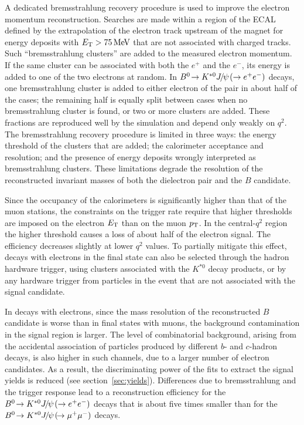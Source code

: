 \documentclass[12pt,a4paper]{article}
\def\Ppsi        {\ensuremath{\uppsi}\xspace}
\def\PB      {\ensuremath{\mathrm{B}}\xspace}
\def\PJ      {\ensuremath{\mathrm{J}}\xspace}
\def\PK      {\ensuremath{\mathrm{K}}\xspace}
\def\Pb      {\ensuremath{\mathrm{b}}\xspace}
\def\Pc      {\ensuremath{\mathrm{c}}\xspace}
\def\Pe      {\ensuremath{\mathrm{e}}\xspace}
\def\Ppsi        {\ensuremath{\psi}\xspace}
\def\PB      {\ensuremath{B}\xspace}
\def\PJ      {\ensuremath{J}\xspace}
\def\PK      {\ensuremath{K}\xspace}
\def\Pb      {\ensuremath{b}\xspace}
\def\Pc      {\ensuremath{c}\xspace}
\def\Pe      {\ensuremath{e}\xspace}
\def\en         {\ensuremath{\Pe^-}\xspace}   \def\ep         {\ensuremath{\Pe^+}\xspace}
\def\epem       {\ensuremath{\Pe^+\Pe^-}\xspace}
\def\cquark    {\ensuremath{\Pc}\xspace}
\def\bquark    {\ensuremath{\Pb}\xspace}
\def\kaon  {\ensuremath{\PK}\xspace}
\def\Kstarz  {\ensuremath{\kaon^{*0}}\xspace}
\def\B       {\ensuremath{\PB}\xspace}
\def\Bd      {\ensuremath{\B^0}\xspace}
\def\jpsi     {\ensuremath{{\PJ\mskip -3mu/\mskip -2mu\Ppsi\mskip 2mu}}\xspace}
\newcommand{\decay}[2]{\ensuremath{#1\!\to #2}\xspace}         \def\ra                 {\ensuremath{\rightarrow}\xspace}
\def\to                 {\ensuremath{\rightarrow}\xspace}
\def\qsq       {\ensuremath{q^2}\xspace}
\newcommand{\mev}{\ensuremath{\mathrm{\,Me\kern -0.1em V}}\xspace}
\def\pt         {\mbox{$p_{\rm T}$}\xspace}
\def\et         {\mbox{$E_{\rm T}$}\xspace}
\def\cqsq{central-\qsq}
\def\BdToKstJPsmm{\mbox{\decay{\Bd}{\Kstarz \jpsi(\decay{}{\mumu})}}\xspace}
\def\BdToKstJPsee{\mbox{\decay{\Bd}{\Kstarz \jpsi(\to\epem)}}\xspace}
\begin{document}
A dedicated bremsstrahlung recovery procedure is used to improve the electron momentum reconstruction.
Searches are made within a region of the ECAL defined by the extrapolation of the electron track upstream of the magnet for energy deposits with $\et > 75\mev$ that are not associated with charged tracks.
Such ``bremsstrahlung clusters'' are added to the measured electron momentum.
If the same cluster can be associated with both the \ep and the \en, its energy is added to one of the two electrons at random.
In \BdToKstJPsee decays, one bremsstrahlung cluster is added to either electron of the pair in about half of the cases; the remaining half is equally split between cases when no bremsstrahlung cluster is found, or two or more clusters are added.
These fractions are reproduced well by the simulation and depend only weakly on \qsq. 
The bremsstrahlung recovery procedure is limited in three ways: the energy threshold of the clusters that are added; the calorimeter acceptance and resolution; and the presence of energy deposits wrongly interpreted as bremsstrahlung clusters.
These limitations degrade the resolution of the reconstructed invariant masses of both the dielectron pair and the \B candidate. 

Since the occupancy of the calorimeters is significantly higher than that of the muon stations, the constraints on the trigger rate require that higher thresholds are imposed on the electron \et than on the muon \pt.
In the \cqsq region the higher threshold causes a loss of about half of the electron signal.
The efficiency decreases slightly at lower \qsq values.
To partially mitigate this effect, decays with electrons in the final state can also be selected through the hadron hardware trigger, using clusters associated with the \Kstarz decay products, or by any hardware trigger from particles in the event that are not associated with the signal candidate.

In decays with electrons, since the mass resolution of the reconstructed \B candidate is worse than in final states with muons, the background contamination in the signal region is larger.
The level of combinatorial background, arising from the accidental association of particles produced by different \bquark- and \cquark-hadron decays, is also higher in such channels, due to a larger number of electron candidates.
As a result, the discriminating power of the fits to extract the signal yields is reduced (see section~\ref{sec:yields}).
Differences due to bremsstrahlung and the trigger response lead to a reconstruction efficiency for the \BdToKstJPsee decays that is about five times smaller than for the \BdToKstJPsmm decays.
\end{document}

